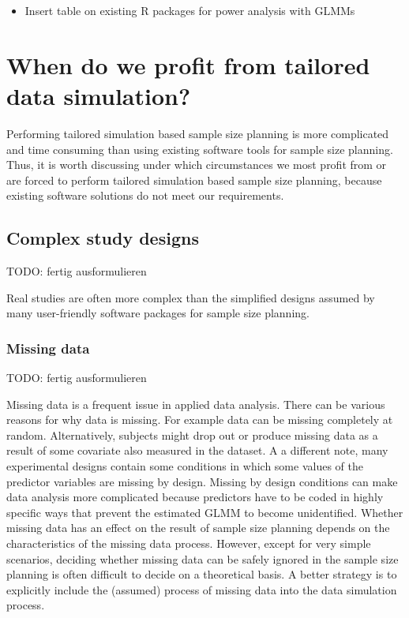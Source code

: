 \documentclass[
  man,floatsintext]{apa6}
\providecommand{\tightlist}{%
  \setlength{\itemsep}{0pt}\setlength{\parskip}{0pt}}
\begin{document}
\begin{itemize}
\tightlist
\item
  Insert table on existing R packages for power analysis with GLMMs
\end{itemize}

\hypertarget{when-do-we-profit-from-tailored-data-simulation}{%
\section{When do we profit from tailored data simulation?}\label{when-do-we-profit-from-tailored-data-simulation}}

Performing tailored simulation based sample size planning is more complicated and time consuming than using existing software tools for sample size planning.
Thus, it is worth discussing under which circumstances we most profit from or are forced to perform tailored simulation based sample size planning, because existing software solutions do not meet our requirements.

\hypertarget{complex-study-designs}{%
\subsection{Complex study designs}\label{complex-study-designs}}

TODO: fertig ausformulieren

Real studies are often more complex than the simplified designs assumed by many user-friendly software packages for sample size planning.

\hypertarget{missing-data}{%
\subsubsection{Missing data}\label{missing-data}}

TODO: fertig ausformulieren

Missing data is a frequent issue in applied data analysis.
There can be various reasons for why data is missing.
For example data can be missing completely at random.
Alternatively, subjects might drop out or produce missing data as a result of some covariate also measured in the dataset.
A a different note, many experimental designs contain some conditions in which some values of the predictor variables are missing by design.
Missing by design conditions can make data analysis more complicated because predictors have to be coded in highly specific ways that prevent the estimated GLMM to become unidentified.
Whether missing data has an effect on the result of sample size planning depends on the characteristics of the missing data process.
However, except for very simple scenarios, deciding whether missing data can be safely ignored in the sample size planning is often difficult to decide on a theoretical basis.
A better strategy is to explicitly include the (assumed) process of missing data into the data simulation process.
\end{document}
